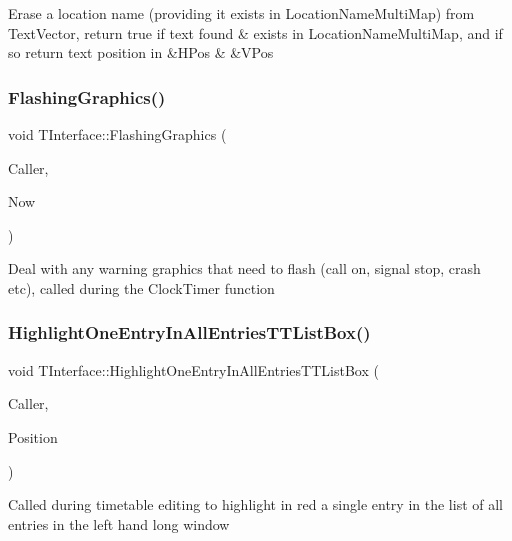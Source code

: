 Erase a location name (providing it exists in Location\+Name\+Multi\+Map) from Text\+Vector, return true if text found \& exists in Location\+Name\+Multi\+Map, and if so return text position in \&H\+Pos \& \&V\+Pos \mbox{\label{class_t_interface_a7e6535742855a19cb3e35b1711a7ab59}} 
\subsubsection{\texorpdfstring{Flashing\+Graphics()}{FlashingGraphics()}}
{\footnotesize\ttfamily void T\+Interface\+::\+Flashing\+Graphics (\begin{DoxyParamCaption}\item[{int}]{Caller,  }\item[{T\+Date\+Time}]{Now }\end{DoxyParamCaption})\hspace{0.3cm}{\ttfamily [private]}}

Deal with any warning graphics that need to flash (call on, signal stop, crash etc), called during the Clock\+Timer function \mbox{\label{class_t_interface_a273468a729b5b2ba5dd599c5ae1a1c19}} 
\subsubsection{\texorpdfstring{Highlight\+One\+Entry\+In\+All\+Entries\+T\+T\+List\+Box()}{HighlightOneEntryInAllEntriesTTListBox()}}
{\footnotesize\ttfamily void T\+Interface\+::\+Highlight\+One\+Entry\+In\+All\+Entries\+T\+T\+List\+Box (\begin{DoxyParamCaption}\item[{int}]{Caller,  }\item[{int}]{Position }\end{DoxyParamCaption})\hspace{0.3cm}{\ttfamily [private]}}

Called during timetable editing to highlight in red a single entry in the list of all entries in the left hand long window \mbox{\label{class_t_interface_a44bce128da0e5ae552031e39552d0c39}} 
